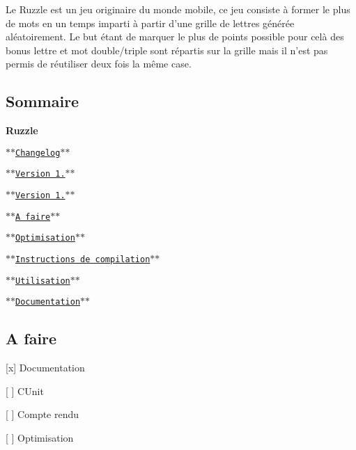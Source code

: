 Le Ruzzle est un jeu originaire du monde mobile, ce jeu consiste à former le plus de mots en un temps imparti à partir d'une grille de lettres générée aléatoirement. Le but étant de marquer le plus de points possible pour celà des bonus lettre et mot double/triple sont répartis sur la grille mais il n'est pas permis de réutiliser deux fois la même case.

\subsection*{Sommaire}

{\bfseries Ruzzle}
\begin{DoxyEnumerate}
\item $\ast$$\ast$\href{#changelog}{\tt Changelog}$\ast$$\ast$
\begin{DoxyItemize}
\item $\ast$$\ast$\href{#version-10}{\tt Version 1.}$\ast$$\ast$
\item $\ast$$\ast$\href{#version-101-à-venir}{\tt Version 1.}$\ast$$\ast$
\end{DoxyItemize}
\item $\ast$$\ast$\href{#a-faire}{\tt A faire}$\ast$$\ast$
\item $\ast$$\ast$\href{#optimisation}{\tt Optimisation}$\ast$$\ast$
\end{DoxyEnumerate}
\begin{DoxyEnumerate}
\item $\ast$$\ast$\href{#instructions-de-compilation}{\tt Instructions de compilation}$\ast$$\ast$
\item $\ast$$\ast$\href{#utilisation}{\tt Utilisation}$\ast$$\ast$
\item $\ast$$\ast$\href{#documentation}{\tt Documentation}$\ast$$\ast$
\end{DoxyEnumerate}

\subsection*{A faire}


\begin{DoxyItemize}
\item \mbox{[}x\mbox{]} Documentation
\item \mbox{[} \mbox{]} C\+Unit
\item \mbox{[} \mbox{]} Compte rendu
\item \mbox{[} \mbox{]} Optimisation
\end{DoxyItemize}

